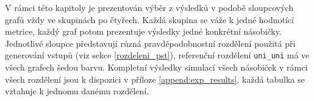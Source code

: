 \begin{table}[!ht]
    \centering
    \caption{Zkoumané násobičky a vybrané metriky naměřené s rozdělením \texttt{uni\_uni}}
    \label{tab:ref_tab}
\end{table}

V rámci této kapitoly je prezentován výběr z výsledků v podobě sloupcových grafů vždy ve skupinách po čtyřech. Každá skupina se váže k jedné hodnotící metrice, každý graf potom prezentuje výsledky jedné konkrétní násobičky. Jednotlivé sloupce představují různá pravděpodobnostní rozdělení použitá při generování vstupů (viz sekce \ref{rozdeleni_pst}), referenční rozdělení \texttt{uni\_uni} má ve všech grafech šedou barvu. Kompletní výsledky simulací všech násobiček v rámci všech rozdělení jsou k dispozici v příloze \ref{append:exp_results}, každá tabulka se vztahuje k jednomu danému rozdělení.

